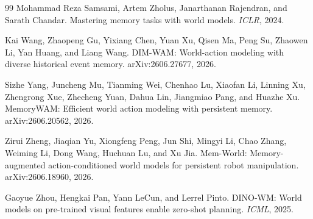 \begin{thebibliography}{99}
Mohammad Reza Samsami, Artem Zholus, Janarthanan Rajendran, and Sarath Chandar.
\newblock Mastering memory tasks with world models.
\newblock \emph{ICLR}, 2024.

Kai Wang, Zhaopeng Gu, Yixiang Chen, Yuan Xu, Qisen Ma, Peng Su, Zhaowen Li, Yan Huang, and Liang Wang.
\newblock DIM-WAM: World-action modeling with diverse historical event memory.
\newblock arXiv:2606.27677, 2026.

Sizhe Yang, Juncheng Mu, Tianming Wei, Chenhao Lu, Xiaofan Li, Linning Xu, Zhengrong Xue, Zhecheng Yuan, Dahua Lin, Jiangmiao Pang, and Huazhe Xu.
\newblock MemoryWAM: Efficient world action modeling with persistent memory.
\newblock arXiv:2606.20562, 2026.

Zirui Zheng, Jiaqian Yu, Xiongfeng Peng, Jun Shi, Mingyi Li, Chao Zhang, Weiming Li, Dong Wang, Huchuan Lu, and Xu Jia.
\newblock Mem-World: Memory-augmented action-conditioned world models for persistent robot manipulation.
\newblock arXiv:2606.18960, 2026.

Gaoyue Zhou, Hengkai Pan, Yann LeCun, and Lerrel Pinto.
\newblock DINO-WM: World models on pre-trained visual features enable zero-shot planning.
\newblock \emph{ICML}, 2025.

\end{thebibliography}
